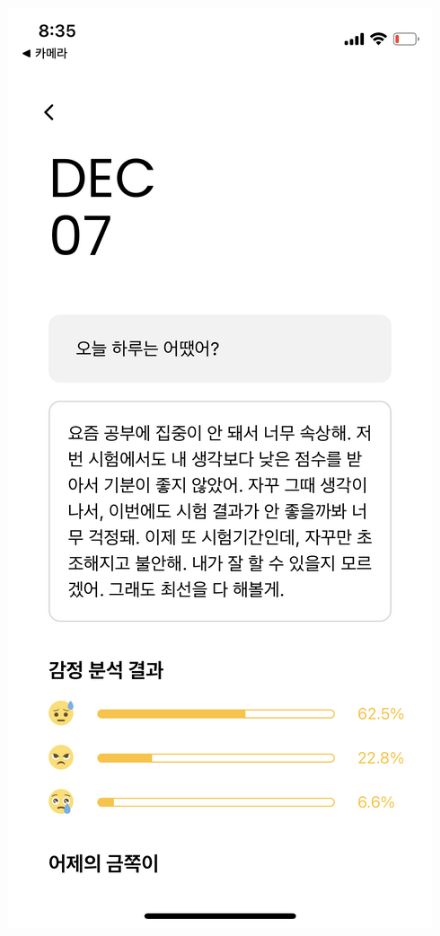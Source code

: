 \documentclass[conference]{IEEEtran}
\begin{document}
\begin{enumerate}
\begin{enumerate}
        \begin{figure}[H]
        \centering
        \includegraphics[scale=0.1]{UseCases/7.presult.png}

\end{figure}
\end{enumerate}
\end{enumerate}
\end{document}
